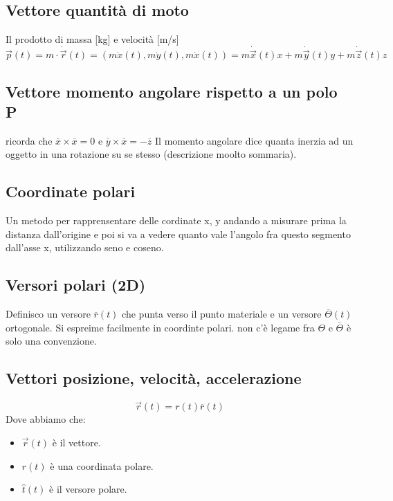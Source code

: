 \subsection{Vettore quantità di moto}
Il prodotto di massa [kg] e velocità [m/s]
$$\vec{p}(t) = m \cdot \dot{\vec{r}}(t) = (m\dot{x}(t), m\dot{y}(t), m\dot{x}(t)) = m\dot{\vec{x}}(t)x + m\dot{\vec{y}}(t)y + m \dot{\vec{z}}(t)z$$

\subsection{Vettore momento angolare rispetto a un polo P}
ricorda che $\overline{x} \times \overline{x} = 0$ e $\overline{y} \times \overline{x} = -\overline{z}$
Il momento angolare dice quanta inerzia ad un oggetto in una rotazione su se stesso (descrizione moolto sommaria).

\subsection{Coordinate polari}
Un metodo per rapprensentare delle cordinate x, y andando a misurare prima la distanza dall'origine e poi si va a vedere
quanto vale l'angolo fra questo segmento dall'asse x, utilizzando seno e coseno.

\subsection{Versori polari (2D)}
Definisco un versore $\overline{r}(t)$ che punta verso il punto materiale e un versore $\overline{\Theta}(t)$ ortogonale.
Si espreime facilmente in coordinte polari.
non c'è legame fra $\Theta$ e $\overline{\Theta}$ è solo una convenzione.

\subsection*{Vettori posizione, velocità, accelerazione}
$$\vec{r}(t) = r(t)\overline{r}(t)$$
Dove abbiamo che:
\begin{itemize}
    \item $\vec{r}(t)$ è il vettore.
    \item $r(t)$ è una coordinata polare.
    \item $\hat{t}(t)$ è il versore polare.
\end{itemize}

